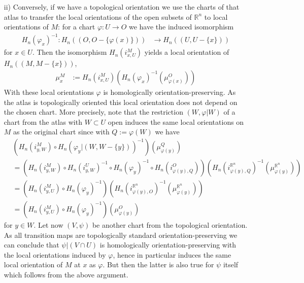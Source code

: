 \begin{prf}
\begin{enumerate}
\item[ii)]
Conversely, if we have a topological orientation we use the charts of that atlas to transfer the local orientations of the open subsets of $\mathbb{R}^{n}$ to local orientations of $M$: for a chart $\varphi \colon U \to O$ we have the induced isomorphism
\begin{align*}
  H_{n}(\varphi_{x})^{-1}
  \colon
  H_{n}((O,O - \lbrace \varphi(x) \rbrace))
  &\to
  H_{n}((U,U - \lbrace x \rbrace))
\end{align*}
for $x \in U$. Then the isomorphism $H_{n}(i_{x,U}^{M})$ yields a local orientation of $H_{n}((M,M - \lbrace x \rbrace))$,
\begin{align*}
  \mu_{x}^{M}
  &:=
  H_{n}(i_{x,U}^{M})
  \left(
    H_{n}(\varphi_{x})^{-1}
    \left(
      \mu_{\varphi(x)}^{O}
    \right)
  \right)
\end{align*}
With these local orientations $\varphi$ is homologically orientation-preserving. As the atlas is topologically oriented this local orientation does not depend on the chosen chart. More precisely, note that the restriction $(W,\varphi\vert W)$ of a chart from the atlas with $W \subset U$ open induces the same local orientations on $M$ as the original chart since with $Q := \varphi(W)$ we have
\begin{align*}
  &
  \left(
    H_{n}(i_{y,W}^{M})
    \circ
    H_{n}
    \left(
       \varphi_{y}\vert(W,W - \lbrace y \rbrace)
    \right)^{-1}
  \right)
  (\mu_{\varphi(y)}^{Q})
  \\
  &=
  \left(
    H_{n}(i_{y,W}^{M})
    \circ
    H_{n}
    \left(
       i_{y,W}^{U}
    \right)^{-1}
    \circ
    H_{n}
    \left(
       \varphi_{y}
    \right)^{-1}
    \circ
    H_{n}
    \left(
       i_{\varphi(y),Q}^{O}
    \right)
  \right)
  \left(
    H_{n}
    \left(
       i_{\varphi(y),Q}^{\mathbb{R}^{n}}
    \right)^{-1}
    (\mu_{\varphi(y)}^{\mathbb{R}^{n}})
  \right)
  \\
  &=
  \left(
    H_{n}(i_{y,U}^{M})
    \circ
    H_{n}
    \left(
       \varphi_{y}
    \right)^{-1}
  \right)
  \left(
    H_{n}
    \left(
       i_{\varphi(y),O}^{\mathbb{R}^{n}}
    \right)^{-1}
    (\mu_{\varphi(y)}^{\mathbb{R}^{n}})
  \right)
  \\
  &=
  \left(
    H_{n}(i_{y,U}^{M})
    \circ
    H_{n}
    \left(
       \varphi_{y}
    \right)^{-1}
  \right)
  (\mu_{\varphi(y)}^{O})
\end{align*}
for $y \in W$. Let now $(V,\psi)$ be another chart from the topological orientation. As all transition maps are topologically standard orientation-preserving we can conclude that $\psi\vert(V \cap U)$ is homologically orientation-preserving with the local orientations induced by $\varphi$, hence in particular induces the same local orientation of $M$ at $x$ as $\varphi$. But then the latter is also true for $\psi$ itself which follows from the above argument.

\end{enumerate}
\end{prf}
